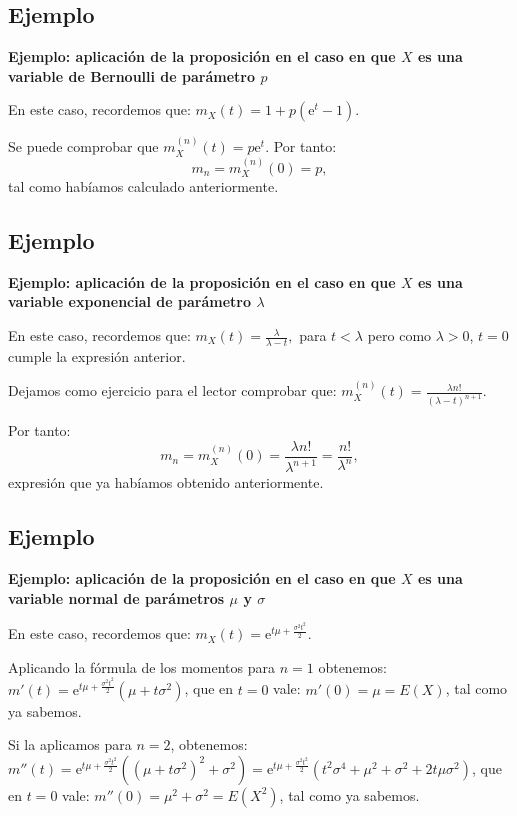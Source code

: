 \documentclass[]{book}
\begin{document}
\hypertarget{ejemplo-24}{%
\subsection{Ejemplo}\label{ejemplo-24}}

\textbf{Ejemplo: aplicación de la proposición en el caso en que \(X\) es una variable de Bernoulli de parámetro \(p\)}

En este caso, recordemos que: \(m_X (t)=1+p\left(\mathrm{e}^t -1 \right).\)

Se puede comprobar que \(m_X^{(n)}(t)=p\mathrm{e}^t\). Por tanto:
\[
m_n = m_X^{(n)}(0)=p,
\]
tal como habíamos calculado anteriormente.

\hypertarget{ejemplo-25}{%
\subsection{Ejemplo}\label{ejemplo-25}}

\textbf{Ejemplo: aplicación de la proposición en el caso en que \(X\) es una variable exponencial de parámetro \(\lambda\)}

En este caso, recordemos que: \(m_X (t)=\frac{\lambda}{\lambda -t},\) para \(t<\lambda\) pero como \(\lambda >0\), \(t=0\) cumple la expresión anterior.

Dejamos como ejercicio para el lector comprobar que: \(m_X^{(n)}(t)=\frac{\lambda n!}{(\lambda-t)^{n+1}}\).

Por tanto:
\[
m_n = m_X^{(n)}(0) = \frac{\lambda n!}{\lambda^{n+1}}=\frac{n!}{\lambda^n},
\]
expresión que ya habíamos obtenido anteriormente.

\hypertarget{ejemplo-26}{%
\subsection{Ejemplo}\label{ejemplo-26}}

\textbf{Ejemplo: aplicación de la proposición en el caso en que \(X\) es una variable normal de parámetros \(\mu\) y \(\sigma\)}

En este caso, recordemos que: \(m_X (t)=\mathrm{e}^{ t \mu +\frac{\sigma^2 t^2}{2}}.\)

Aplicando la fórmula de los momentos para \(n=1\) obtenemos:
\(m'(t)=\mathrm{e}^{ t \mu +\frac{\sigma^2 t^2}{2}} \left(\mu+t\sigma^2\right)\), que en \(t=0\) vale:
\(m'(0)=\mu=E(X)\), tal como ya sabemos.

Si la aplicamos para \(n=2\), obtenemos:
\(m''(t)=\mathrm{e}^{ t \mu +\frac{\sigma^2 t^2}{2}} \left((\mu+t\sigma^2)^2+ \sigma^2 \right) =\mathrm{e}^{ t \mu +\frac{\sigma^2 t^2}{2}} \left(t^2\sigma^4+\mu^2+\sigma^2+ 2t\mu\sigma^2 \right)\), que en \(t=0\) vale:
\(m''(0)=\mu^2+\sigma^2=E\left(X^2\right)\), tal como ya sabemos.
\end{document}
